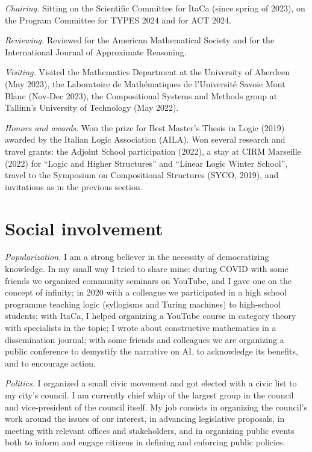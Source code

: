 \documentclass[a4paper,9pt]{article}
\begin{document}
\textit{Chairing.} Sitting on the Scientific Committee for ItaCa (since spring of 2023), on the Program Committee for TYPES 2024 and for ACT 2024.

\textit{Reviewing.} Reviewed for the American Mathematical Society and for the International Journal of Approximate Reasoning.

\textit{Visiting.} Visited the Mathematics Department at the University of Aberdeen (May 2023), the Laboratoire de Mathématiques de l'Université Savoie Mont Blanc (Nov-Dec 2023), the Compositional Systems and Methods group at Tallinn's University of Technology (May 2022).

\textit{Honors and awards.} Won the prize for Best Master's Thesis in Logic (2019) awarded by the Italian Logic Association (AILA). Won several research and travel grants: the Adjoint School participation (2022), a stay at CIRM Marseille (2022) for ``Logic and Higher Structures'' and ``Linear Logic Winter School'', travel to the Symposium on Compositional Structures (SYCO, 2019), and invitations as in the previous section.

\section*{ Social involvement}
\textit{Popularization.} I am a strong believer in the necessity of democratizing knowledge. In my small way I tried
to share mine: during COVID with some friends we organized community seminars on YouTube, and I gave one on the concept of infinity; in 2020 with a colleague we participated in a high school programme teaching logic (syllogisms and Turing machines) to high-school students; with ItaCa, I helped organizing a YouTube course in category theory with specialists in the topic; I wrote about constructive mathematics in a dissemination journal; with some friends and colleagues we are organizing a public conference to demystify the narrative on AI, to acknowledge its benefits, and to encourage action.

\textit{Politics.} I organized a small civic movement and got elected with a civic list to my city's council. I am
currently chief whip of the largest group in the council and vice-president of the council itself.
My job consists in organizing the council's work around the issues of our interest, in advancing legislative
proposals, in meeting with relevant offices and stakeholders, and in organizing public events both to inform
and engage citizens in defining and enforcing public policies.
\end{document}
